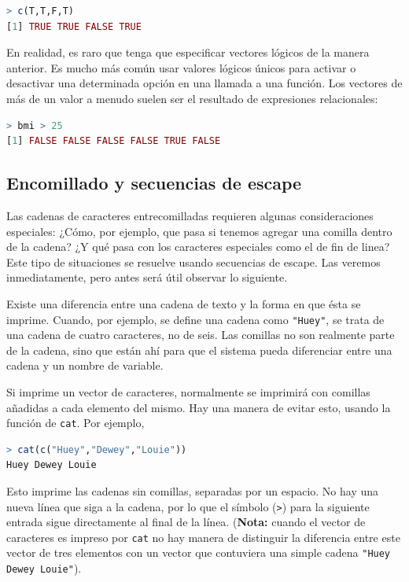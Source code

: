 \begin{lstlisting}[language=R]
> c(T,T,F,T)
[1] TRUE TRUE FALSE TRUE
\end{lstlisting}

En realidad, es raro que tenga que especificar vectores lógicos de la manera
anterior. Es mucho más común usar valores lógicos únicos para activar o
desactivar una determinada opción en una llamada a una función. Los vectores de
más de un valor a menudo suelen ser el resultado de expresiones relacionales:


\begin{lstlisting}[language=R]
> bmi > 25
[1] FALSE FALSE FALSE FALSE TRUE FALSE
\end{lstlisting}

\subsection{Encomillado y secuencias de escape}\label{encomillado}

Las cadenas de caracteres entrecomilladas requieren algunas consideraciones
especiales: ¿Cómo, por ejemplo, que pasa si tenemos agregar una comilla dentro
de la cadena? ¿Y qué pasa con los caracteres especiales como el de fin de
linea? Este tipo de situaciones se resuelve usando secuencias de escape. Las
veremos inmediatamente, pero antes será útil observar lo siguiente.

Existe una diferencia entre una cadena de texto y la forma en que ésta se
imprime. Cuando, por ejemplo, se define una cadena como \texttt{"Huey"}, se
trata de una cadena de cuatro caracteres, no de seis. Las comillas no son
realmente parte de la cadena, sino que están ahí para que el sistema pueda
diferenciar entre una cadena y un nombre de variable.

Si imprime un vector de caracteres, normalmente se imprimirá con comillas
añadidas a cada elemento del mismo. Hay una manera de evitar esto, usando la
función de \texttt{cat}.  Por ejemplo,

\begin{lstlisting}[language=R]
> cat(c("Huey","Dewey","Louie"))
Huey Dewey Louie
\end{lstlisting}

Esto imprime las cadenas sin comillas, separadas por un espacio. No hay una
nueva línea que siga a la cadena, por lo que el símbolo (\texttt{>}) para la
siguiente entrada sigue directamente al final de la línea. (\textbf{Nota:}
cuando el vector de caracteres es impreso por \texttt{cat} no hay manera de
distinguir la diferencia entre este vector de tres elementos con un vector que
contuviera una simple cadena \texttt{"Huey Dewey Louie"}).

